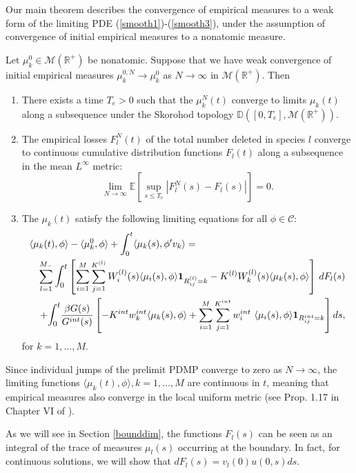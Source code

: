   Our main theorem describes the convergence  of empirical measures to a weak form of the limiting PDE (\ref{smooth1})-(\ref{smooth3}), under the assumption of convergence of initial empirical measures to a nonatomic measure. 

\begin{theorem}\label{pdmpproof}
Let $\mu_k^0 \in\mathcal M(\mathbb{R}^+)$ be nonatomic. Suppose that we have weak convergence of initial empirical measures $\mu_k^{0,N} \rightarrow \mu_k^0$ as $N\rightarrow \infty$ in $\mathcal M(\mathbb{R}^+)$.  Then 
\begin{enumerate}
\item There exists a  time $T_e>0$ such that the   $\mu_k^N(t)$ converge to  limits $\mu_k(t)$ along a subsequence under the Skorohod topology $\mathbb D([0,T_e],\mathcal M(\mathbb{R}^+))$.
\item The empirical losses $F_l^N(t)$ of the total number deleted in species $l$  converge to continuous cumulative distribution functions $F_l(t)$ along a subsequence in the mean $L^\infty$ metric:
\begin{equation}
\lim_{N\rightarrow \infty}\mathbb E\left[\sup_{s\le T_e}|F_l^{N}(s)-F_{l}(s)|\right  ]= 0.
\end{equation}
\item The  $\mu_k(t)$ satisfy the following limiting equations for all
$\phi \in \mathcal C:$
\begin{eqnarray}\label{limeq}
\lefteqn{\langle \mu_k(t), \phi\rangle  - \langle \mu_k^0, \phi\rangle+\int_0^t\langle \mu_k(s), \phi' v_k \rangle=}\\ 
&&\sum_{l = 1}^{M_-}\mathlarger{\int_0^t} \left[\sum_{i = 1}^{M}\sum_{j= 1}^{K^{(l)}}W_i^{(l)}(s)\langle \mu_i(s), \phi\rangle\mathbf{1}_{R^{(l)}_{ij} = k}  -K^{(l)}W_k^{(l)}(s)\langle \mu_k(s), \phi\rangle\right ] \, dF_{l}(s)\nonumber\\  
&& +\mathlarger{\int_0^t}\frac{\beta G(s)}{G^{int}(s)}\left[-K^{int}w^{int}_k\langle \mu_k(s), \phi \rangle +\sum_{i = 1}^{M}\sum_{j= 1}^{K^{int}} w^{int}_i\ \langle \mu_i(s), \phi \rangle\mathbf{1}_{R^{int}_{ij} = k}\right]ds, \nonumber
\end{eqnarray}
for $k = 1, \dots, M$.


\end{enumerate}
 


\end{theorem} 
\begin{rem}\label{unifremark}
Since individual jumps of the prelimit PDMP converge to zero as $N\rightarrow \infty$, the limiting functions $\langle \mu_k(t), \phi\rangle, k = 1, \dots, M$ are continuous in $t$, meaning that empirical measures also converge in the local uniform metric (see Prop. 1.17 in Chapter VI of \cite{jac87}).    
\end{rem}
As we will see in Section \ref{bounddim}, the functions $F_l(s)$ can be seen as an integral of the trace of measures $\mu_l(s)$ occurring at the boundary. In fact, for continuous solutions, we will show that $dF_l(s) = v_l(0)u(0,s)ds$. 


